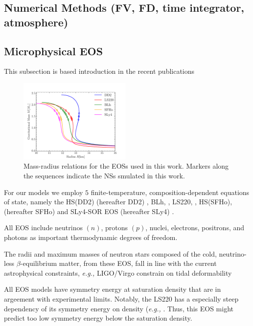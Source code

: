 \documentclass[11pt,a4paper,headinclude=true,DIV=14,BCOR=8mm,chapterprefix,listof=totoc,twoside,openright,abstracton]{scrbook}
\begin{document}
\subsection{Numerical Methods (FV, FD, time integrator, atmosphere)}

\subsection{Microphysical EOS}



This subsection is based introduction in the recent publications 
\cite{Radice:2018pdn,Perego:2019adq,Bernuzzi:2020txg,Nedora:2020pak}

\begin{figure}[t]
    \centering 
    \includegraphics[width=0.49\textwidth]{./figs/tov_mr.pdf}
    \caption{Mass-radius relations for the EOSs used in this work. 
        Markers along the sequences indicate the NSs smulated in this work.}  
    \label{fig:method:tov_mr}
\end{figure}

For our models we employ $5$ finite-temperature, composition-dependent equations of state, namely the 
HS(DD2) (hereafter DD2) \cite{Typel:2009sy,Hempel:2009mc}, 
BLh, \cite{Bombaci:2018ksa}, 
LS220, \cite{Lattimer:1991nc}, 
HS(SFHo), (hereafter SFHo) \cite{Steiner:2012rk} and 
SLy4-SOR EOS (hereafter SLy4) \cite{daSilvaSchneider:2017jpg}.

All EOS include neutrinos $(n)$, protons $(p)$, nuclei, electrons, positrons, and photons
as important thermodynamic degrees of freedom.

The radii and maximum masses of neutron stars composed of the cold, neutrino-less $\beta$-equilibrium matter,
from these EOS, fall in line with the current astrophysical constraints, 
\textit{e.g.,} LIGO/Virgo constrain on tidal deformability 
\cite{TheLIGOScientific:2017qsa,Abbott:2018wiz,De:2018uhw,Abbott:2018exr}

All EOS models have symmetry energy at saturation density that are in argeement with experimental limits.
Notably, the LS220 has a especially steep dependency of its symmetry energy on density (\textit{e.g.,} \cite{Lattimer:2012xj,Danielewicz:2013upa}. Thus, this EOS might predict too low symmetry energy below the saturation density. 
\end{document}
